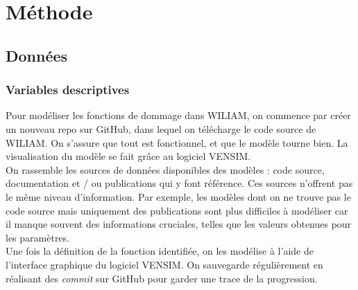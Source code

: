 

\section{Méthode}

\subsection{Données}

\subsubsection{Variables descriptives}


\begin{methodbox}

Pour modéliser les fonctions de dommage dans WILIAM, on commence par créer un nouveau repo sur GitHub, dans lequel on télécharge le code source de WILIAM. On s'assure que tout est fonctionnel, et que le modèle tourne bien. La visualisation du modèle se fait grâce au logiciel VENSIM. \\

On rassemble les sources de données disponibles des modèles : code source, documentation et / ou publications qui y font référence. Ces sources n'offrent pas le même niveau d'information. Par exemple, les modèles dont on ne trouve pas le code source mais uniquement des publications sont plus difficiles à modéliser car il manque souvent des informations cruciales, telles que les valeurs obtenues pour les paramètres. \\

Une fois la définition de la fonction identifiée, on les modélise à l'aide de l'interface graphique du logiciel VENSIM. On sauvegarde régulièrement en réalisant des \textit{commit} sur GitHub pour garder une trace de la progression.
    
\end{methodbox}


